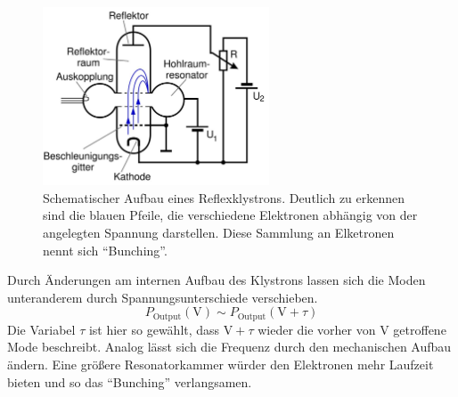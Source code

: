 \begin{figure}
    \centering
    \includegraphics[width=0.6\textwidth]{bilder/theo.JPG}
    \caption{Schematischer Aufbau eines Reflexklystrons. Deutlich zu erkennen sind die blauen Pfeile, die verschiedene Elektronen abhängig von der angelegten Spannung darstellen. 
    Diese Sammlung an Elketronen nennt sich \enquote{Bunching}.} 
    \label{fig:ref}
\end{figure}
Durch Änderungen am internen Aufbau des Klystrons lassen sich die Moden unteranderem durch Spannungsunterschiede verschieben. 
\begin{equation*}
    P_{\text{Output}} (\si{\volt}) \sim P_{\text{Output}} (\si{\volt} + \tau)
\end{equation*}
Die Variabel $\tau$ ist hier so gewählt, dass $\si{\volt} + \tau$ wieder die vorher von $\si{\volt}$ getroffene Mode beschreibt.
Analog lässt sich die Frequenz durch den mechanischen Aufbau ändern. Eine größere Resonatorkammer würder den Elektronen 
mehr Laufzeit bieten und so das \enquote{Bunching} verlangsamen.

\newpage 

